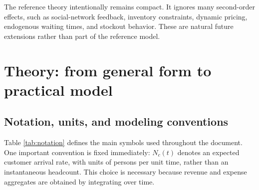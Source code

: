 \documentclass{article}
\begin{document}
The reference theory intentionally remains compact. It ignores many second-order effects, such as social-network feedback, inventory constraints, dynamic pricing, endogenous waiting times, and stockout behavior. These are natural future extensions rather than part of the reference model.

\section{Theory: from general form to practical model}
\label{sec:theory}

\subsection{Notation, units, and modeling conventions}
\label{sec:notation}

Table \ref{tab:notation} defines the main symbols used throughout the document. One important convention is fixed immediately: \( N_c(t) \) denotes an expected customer arrival rate, with units of persons per unit time, rather than an instantaneous headcount. This choice is necessary because revenue and expense aggregates are obtained by integrating over time.
\end{document}
